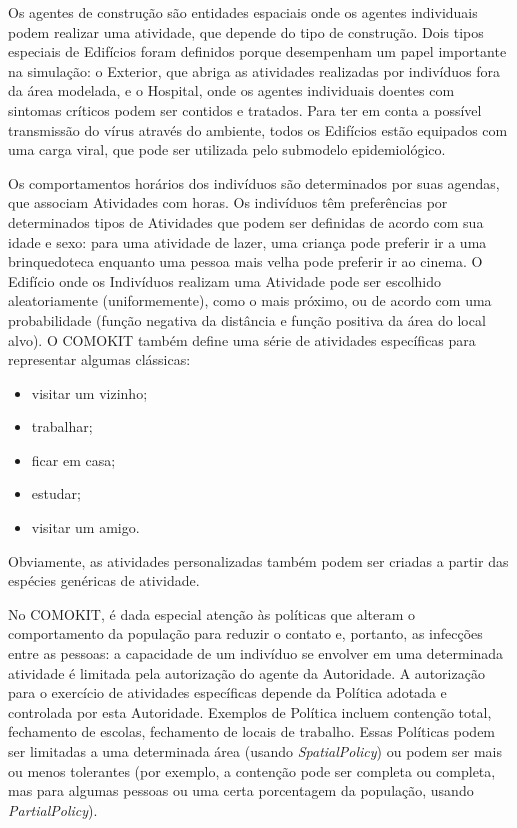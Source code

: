 
Os agentes de construção são entidades espaciais onde os agentes individuais podem realizar uma atividade, que depende do tipo de construção. Dois tipos especiais de Edifícios foram definidos porque desempenham um papel importante na simulação: o Exterior, que abriga as atividades realizadas por indivíduos fora da área modelada, e o Hospital, onde os agentes individuais doentes com sintomas críticos podem ser contidos e tratados. Para ter em conta a possível transmissão do vírus através do ambiente, todos os Edifícios estão equipados com uma carga viral, que pode ser utilizada pelo submodelo epidemiológico. \cite{gaudou2020comokit}

Os comportamentos horários dos indivíduos são determinados por suas agendas, que associam Atividades com horas. Os indivíduos têm preferências por determinados tipos de Atividades que podem ser definidas de acordo com sua idade e sexo: para uma atividade de lazer, uma criança pode preferir ir a uma brinquedoteca enquanto uma pessoa mais velha pode preferir ir ao cinema. O Edifício onde os Indivíduos realizam uma Atividade pode ser escolhido aleatoriamente (uniformemente), como o mais próximo, ou de acordo com uma probabilidade (função negativa da distância e função positiva da área do local alvo). O COMOKIT também define uma série de atividades específicas para representar algumas clássicas: 
\begin{itemize}
\item visitar um vizinho;
\item trabalhar;
\item ficar em casa;
\item estudar;
\item visitar um amigo.
\end{itemize}

Obviamente, as atividades personalizadas também podem ser criadas a partir das espécies genéricas de atividade. \cite{gaudou2020comokit}

No COMOKIT, é dada especial atenção às políticas que alteram o comportamento da população para reduzir o contato e, portanto, as infecções entre as pessoas: a capacidade de um indivíduo se envolver em uma determinada atividade é limitada pela autorização do agente da Autoridade. A autorização para o exercício de atividades específicas depende da Política adotada e controlada por esta Autoridade. Exemplos de Política incluem contenção total, fechamento de escolas, fechamento de locais de trabalho. Essas Políticas podem ser limitadas a uma determinada área (usando \textit{SpatialPolicy}) ou podem ser mais ou menos tolerantes (por exemplo, a contenção pode ser completa ou completa, mas para algumas pessoas ou uma certa porcentagem da população, usando \textit{PartialPolicy}). \cite{gaudou2020comokit}

